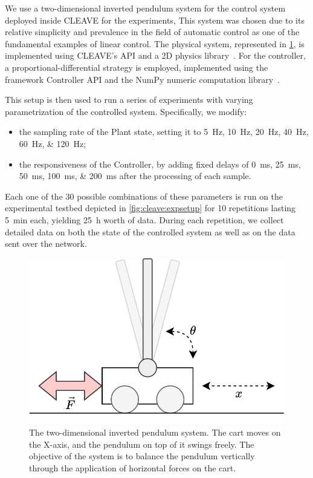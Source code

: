 We use a two-dimensional inverted pendulum system for the control system deployed inside CLEAVE for the experiments, 
This system was chosen due to its relative simplicity and prevalence in the field of automatic control as one of the fundamental examples of linear control.
The physical system, represented in \cref{fig:invpend}, is implemented using CLEAVE's API and a 2D physics library~\autocite{chipmunk2d,pymunk}.
For the controller, a proportional-differential strategy is employed, implemented using the framework Controller API and the NumPy numeric computation library~\autocite{harris2020array}.

This setup is then used to run a series of experiments with varying parametrization of the controlled system.
Specifically, we modify:
\begin{itemize}
    \item the sampling rate of the Plant state, setting it to \SIlist[list-units=single,list-final-separator={, or }]{5;10;20;40;60;120}{\hertz};
    \item the responsiveness of the Controller, by adding fixed delays of  \SIlist[list-units=single,list-final-separator={, or }]{0;25;50;100;200}{\milli\second} after the processing of each sample.
\end{itemize}
Each one of the \num{30} possible combinations of these parameters is run on the experimental testbed depicted in \cref{fig:cleave:expsetup} for \num{10} repetitions lasting \SI{5}{\minute} each, yielding \SI{25}{\hour} worth of data.
During each repetition, we collect detailed data on both the state of the controlled system as well as on the data sent over the network.


\begin{figure}
    \centering
    \includegraphics[width=.95\columnwidth]{images/inverted_pendulum.png}
    \caption{
        The two-dimensional inverted pendulum system.
        The cart moves on the X-axis, and the pendulum on top of it swings freely.
        The objective of the system is to balance the pendulum vertically through the application of horizontal forces on the cart.
    }\label{fig:invpend}
\end{figure}
